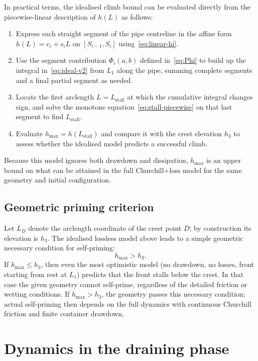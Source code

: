 \documentclass[11pt]{article}
\begin{document}
In practical terms, the idealised climb bound can be evaluated directly from the
piecewise-linear description of $h(L)$ as follows:
\begin{enumerate}
  \item Express each straight segment of the pipe centreline in the affine form
    $h(L)=c_i+s_iL$ on $[S_{i-1},S_i]$ using~\eqref{eq:linear-hi}.
  \item Use the segment contribution $\Phi_i(a,b)$ defined in~\eqref{eq:Phi} to build up the
    integral in~\eqref{eq:ideal-v2} from $L_1$ along the pipe, summing complete segments and
    a final partial segment as needed.
  \item Locate the first arclength $L=L_{\text{stall}}$ at which the cumulative integral
    changes sign, and solve the monotone equation~\eqref{eq:stall-piecewise} on that last
    segment to find $L_{\text{stall}}$.
  \item Evaluate $h_{\max} = h(L_{\text{stall}})$ and compare it with the crest elevation
    $h_3$ to assess whether the idealised model predicts a successful climb.
\end{enumerate}
Because this model ignores both drawdown and dissipation, $h_{\max}$ is an upper bound on
what can be attained in the full Churchill+loss model for the same geometry and initial
configuration.

\subsection{Geometric priming criterion}

Let $L_D$ denote the arclength coordinate of the crest point $D$; by construction its elevation is $h_3$.
The idealised lossless model above leads to a simple geometric necessary condition for
self-priming:
\begin{equation}
  h_{\max} > h_3.
\end{equation}
If $h_{\max} \le h_3$, then even the most optimistic model (no drawdown, no losses, front
starting from rest at $L_1$) predicts that the front stalls below the crest. In that case the
given geometry cannot self-prime, regardless of the detailed friction or wetting conditions.
If $h_{\max} > h_3$, the geometry passes this necessary condition; actual self-priming then
depends on the full dynamics with continuous Churchill friction and finite container
drawdown.


\section{Dynamics in the draining phase}
\end{document}

